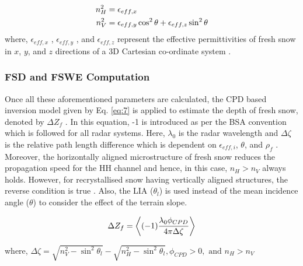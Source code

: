 \documentclass[review]{elsarticle}
\numberwithin{equation}{section}
\numberwithin{figure}{section}
\numberwithin{table}{section}
\begin{document}
\begin{subequations}
    \centering
    \begin{align}
        \label{seq:nh}
        n_H^2 &= \epsilon_{eff, x}\\
        \label{seq:nv}
        n_V^2 &= \epsilon_{eff, y}\cos^2\theta + \epsilon_{eff, z}\sin^2\theta 
    \end{align}
\end{subequations}
where, $\epsilon_{eff, x}$ , $\epsilon_{eff, y}$ , and $\epsilon_{eff, z}$ represent the effective permittivities of fresh snow in $x$, $y$, and $z$ directions of a 3D Cartesian co-ordinate system \citep{Leinss2014}.

\subsubsection{FSD and FSWE Computation}

Once all these aforementioned parameters are calculated, the CPD based inversion model given by Eq. \eqref{eq:7} is applied to estimate the depth of fresh snow, denoted by $\Delta{Z_f}$ \citep{Majumdar2019, Leinss2014, Leinss2016}. In this equation, -1 is introduced as per the BSA convention which is followed for all radar systems. Here, $\lambda_0$ is the radar wavelength and $\Delta\zeta$ is the relative path length difference which is dependent on $\epsilon_{eff, i}$, $\theta$, and $\rho_f$ \citep{Leinss2016}. Moreover, the horizontally aligned microstructure of fresh snow reduces the propagation speed for the HH channel and hence, in this case, $n_H > n_V$ always holds. However, for recrystallised snow having vertically aligned structures, the reverse condition is true \citep{Leinss2016}. Also, the LIA ($\theta_l$) is used instead of the mean incidence angle ($\theta$) to consider the effect of the terrain slope.

\begin{equation}
    \centering
    \label{eq:7}
    \Delta{Z_f} = \left\langle(-1)\frac{\lambda_0\phi_{CPD}}{4\pi\Delta{\zeta}}\right\rangle
\end{equation}
\begin{center}where, $\Delta{\zeta} = \sqrt{n^2_V - \sin^{2}\theta_l} - \sqrt{n^2_H - \sin^{2}\theta_l}, \phi_{CPD} > 0, \text{ and } n_H > n_V$\end{center}
\end{document}
